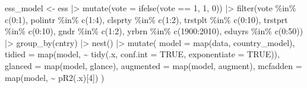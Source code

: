 \documentclass[
  letterpaper,
  DIV=11,
  numbers=noendperiod]{scrreprt}
\newenvironment{Shaded}{\begin{snugshade}}{\end{snugshade}}
\newcommand{\AttributeTok}[1]{\textcolor[rgb]{0.40,0.45,0.13}{#1}}
\newcommand{\ConstantTok}[1]{\textcolor[rgb]{0.56,0.35,0.01}{#1}}
\newcommand{\DecValTok}[1]{\textcolor[rgb]{0.68,0.00,0.00}{#1}}
\newcommand{\FunctionTok}[1]{\textcolor[rgb]{0.28,0.35,0.67}{#1}}
\newcommand{\NormalTok}[1]{\textcolor[rgb]{0.00,0.23,0.31}{#1}}
\newcommand{\OtherTok}[1]{\textcolor[rgb]{0.00,0.23,0.31}{#1}}
\newcommand{\SpecialCharTok}[1]{\textcolor[rgb]{0.37,0.37,0.37}{#1}}
\begin{document}
\begin{Shaded}
\begin{Highlighting}[]
\NormalTok{ess\_model }\OtherTok{\textless{}{-}}\NormalTok{ ess }\SpecialCharTok{|\textgreater{}} 
    \FunctionTok{mutate}\NormalTok{(}\AttributeTok{vote =} \FunctionTok{ifelse}\NormalTok{(vote }\SpecialCharTok{==} \DecValTok{1}\NormalTok{, }\DecValTok{1}\NormalTok{, }\DecValTok{0}\NormalTok{)) }\SpecialCharTok{|\textgreater{}}
    \FunctionTok{filter}\NormalTok{(vote }\SpecialCharTok{\%in\%} \FunctionTok{c}\NormalTok{(}\DecValTok{0}\SpecialCharTok{:}\DecValTok{1}\NormalTok{),}
\NormalTok{           polintr }\SpecialCharTok{\%in\%} \FunctionTok{c}\NormalTok{(}\DecValTok{1}\SpecialCharTok{:}\DecValTok{4}\NormalTok{),}
\NormalTok{           clsprty }\SpecialCharTok{\%in\%} \FunctionTok{c}\NormalTok{(}\DecValTok{1}\SpecialCharTok{:}\DecValTok{2}\NormalTok{),}
\NormalTok{           trstplt }\SpecialCharTok{\%in\%} \FunctionTok{c}\NormalTok{(}\DecValTok{0}\SpecialCharTok{:}\DecValTok{10}\NormalTok{), }
\NormalTok{           trstprt }\SpecialCharTok{\%in\%} \FunctionTok{c}\NormalTok{(}\DecValTok{0}\SpecialCharTok{:}\DecValTok{10}\NormalTok{), }
\NormalTok{           gndr }\SpecialCharTok{\%in\%} \FunctionTok{c}\NormalTok{(}\DecValTok{1}\SpecialCharTok{:}\DecValTok{2}\NormalTok{),}
\NormalTok{           yrbrn }\SpecialCharTok{\%in\%} \FunctionTok{c}\NormalTok{(}\DecValTok{1900}\SpecialCharTok{:}\DecValTok{2010}\NormalTok{),}
\NormalTok{           eduyrs }\SpecialCharTok{\%in\%} \FunctionTok{c}\NormalTok{(}\DecValTok{0}\SpecialCharTok{:}\DecValTok{50}\NormalTok{)) }\SpecialCharTok{|\textgreater{}}
    \FunctionTok{group\_by}\NormalTok{(cntry) }\SpecialCharTok{|\textgreater{}}
    \FunctionTok{nest}\NormalTok{() }\SpecialCharTok{|\textgreater{}} 
    \FunctionTok{mutate}\NormalTok{(}
        \AttributeTok{model =} \FunctionTok{map}\NormalTok{(data, country\_model),}
        \AttributeTok{tidied =} \FunctionTok{map}\NormalTok{(model, }\SpecialCharTok{\textasciitilde{}} \FunctionTok{tidy}\NormalTok{(.x, }\AttributeTok{conf.int =} \ConstantTok{TRUE}\NormalTok{, }\AttributeTok{exponentiate =} \ConstantTok{TRUE}\NormalTok{)),}
        \AttributeTok{glanced =} \FunctionTok{map}\NormalTok{(model, glance),}
        \AttributeTok{augmented =} \FunctionTok{map}\NormalTok{(model, augment),}
        \AttributeTok{mcfadden =} \FunctionTok{map}\NormalTok{(model, }\SpecialCharTok{\textasciitilde{}} \FunctionTok{pR2}\NormalTok{(.x)[}\DecValTok{4}\NormalTok{])}
\NormalTok{    )}
\end{Highlighting}
\end{Shaded}
\end{document}
